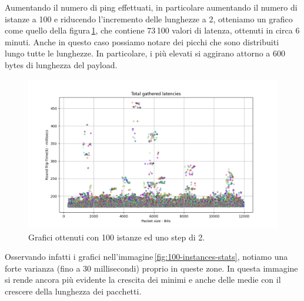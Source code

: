 \FloatBarrier\noindent Aumentando il numero di ping effettuati, in particolare aumentando il numero di istanze a 100 e riducendo l'incremento delle lunghezze a 2, otteniamo un grafico come quello della figura\,\ref{fig:100-instances-total}, che contiene 73\,100 valori di latenza, ottenuti in circa 6 minuti. Anche in questo caso possiamo notare dei picchi che sono distribuiti lungo tutte le lunghezze. In particolare, i più elevati si aggirano attorno a 600 bytes di lunghezza del payload. 
\begin{figure}[h]
    \centering
    \includegraphics[width = .9\textwidth]{hw-2/report/imgs/100-instances/la-total-latencies.png}
    \caption{Grafici ottenuti con 100 istanze ed uno step di 2.}
    \label{fig:100-instances-total}
\end{figure}
Osservando infatti i grafici nell'immagine\,\ref{fig:100-instances-stats}, notiamo una forte varianza (fino a 30 millisecondi) proprio in queste zone. In questa immagine si rende ancora più evidente la crescita dei minimi e anche delle medie con il crescere della lunghezza dei pacchetti.
